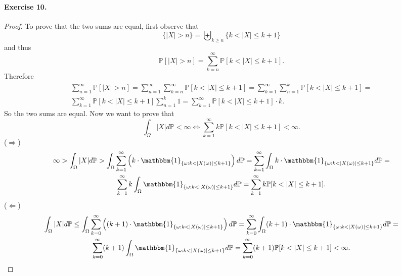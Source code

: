 \documentclass[12pt,a4paper]{report}
\theoremstyle{definition}
\theoremstyle{num.custom-title}
\renewcommand{\P}{\mathbb{P}}
\renewcommand{\1}{\mathbbm{1}}
\begin{document}
\paragraph{Exercise 10.}
\begin{proof}
To prove that the two sums are equal, first observe that 
\[
\{|X|>n\}= \biguplus_{k \geq n} \{k < |X| \leq k+1\}
\]
and thus 
\[
\P[|X|>n] = \sum_{k=n}^\infty \P[k < |X| \leq k+1].
\]
Therefore
\begin{multline*}
\sum_{n=1}^\infty \P[|X|>n] = \sum_{n=1}^\infty \sum_{k=n}^\infty \P[k < |X| \leq k+1] = \sum_{k=1}^\infty \sum_{n=1}^k \P[k < |X| \leq k+1] =\\
\sum_{k=1}^\infty \P[k < |X| \leq k+1] \sum_{n=1}^k 1 = \sum_{k=1}^\infty \P[k < |X| \leq k+1] \cdot k.
\end{multline*}
So the two sums are equal. Now we want to prove that 
\[
\int_\Omega |X| d\P < \infty \iff \sum_{k=1}^\infty k \P[k < |X| \leq k+1] < \infty.
\]
($\Longrightarrow$)
\begin{multline*}
\infty > \int_\Omega |X| d\P > \int_\Omega \sum_{k=1}^\infty \left( k \cdot \1_{\{\omega : k<|X(\omega)| \leq k+1\}} \right) d\P= \sum_{k=1}^\infty \int_\Omega k \cdot \1_{\{\omega : k<|X(\omega)| \leq k+1\}} d\P=\\
\sum_{k=1}^\infty k \int_\Omega \1_{\{\omega : k<|X(\omega)| \leq k+1\}} d\P = \sum_{k=1}^\infty k \P[k < |X| \leq k+1].
\end{multline*}
($\Longleftarrow$)
\begin{multline*}
\int_\Omega |X| d\P \leq \int_\Omega \sum_{k=0}^\infty \left( (k+1) \cdot \1_{\{\omega : k<|X(\omega)| \leq k+1\}} \right) d\P = \sum_{k=0}^\infty \int_\Omega (k+1) \cdot \1_{\{\omega : k<|X(\omega)| \leq k+1\}} d\P=\\
\sum_{k=0}^\infty (k+1) \int_\Omega \1_{\{\omega : k<|X(\omega)| \leq k+1\}} d\P = \sum_{k=0}^\infty (k+1) \P[k < |X| \leq k+1] < \infty.
\end{multline*}

\end{proof}
\end{document}
